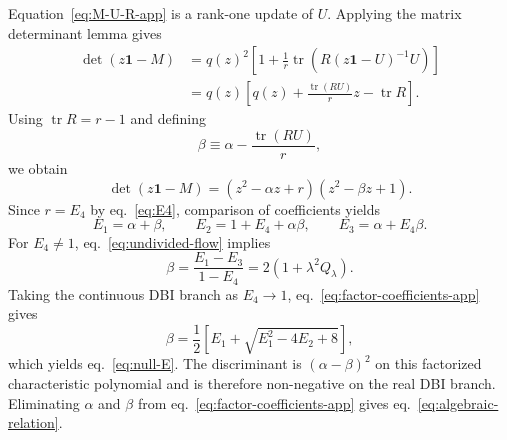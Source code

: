 \documentclass[a4paper,11pt]{article}
\numberwithin{equation}{section}
\newcommand{\tr}{\operatorname{tr}}
\newcommand{\Id}{\mathbf 1}
\begin{document}
Equation~\eqref{eq:M-U-R-app} is a rank-one update of $U$. Applying the matrix determinant lemma gives
\begin{align}
 \det(z\Id-M)
 &=q(z)^2\left[1+\frac1r\tr\!\left(R(z\Id-U)^{-1}U\right)\right]\nonumber\\
 &=q(z)\left[q(z)+\frac{\tr(RU)}{r}z-\tr R\right].
 \label{eq:char-factor-intermediate-app}
\end{align}
Using $\tr R=r-1$ and defining
\begin{equation}
 \beta\equiv\alpha-\frac{\tr(RU)}{r},
\end{equation}
we obtain
\begin{equation}
 \det(z\Id-M)
 =(z^2-\alpha z+r)(z^2-\beta z+1).
 \label{eq:char-factor-app}
\end{equation}
Since $r=E_4$ by eq.~\eqref{eq:E4}, comparison of coefficients yields
\begin{equation}
 E_1=\alpha+\beta,
 \qquad
 E_2=1+E_4+\alpha\beta,
 \qquad
 E_3=\alpha+E_4\beta.
 \label{eq:factor-coefficients-app}
\end{equation}
For $E_4\neq1$, eq.~\eqref{eq:undivided-flow} implies
\begin{equation}
 \beta=\frac{E_1-E_3}{1-E_4}=2(1+\lambda^2Q_\lambda).
 \label{eq:beta-app}
\end{equation}
Taking the continuous DBI branch as $E_4\to1$, eq.~\eqref{eq:factor-coefficients-app} gives
\begin{equation}
 \beta=\frac12\left[E_1+\sqrt{E_1^2-4E_2+8}\right],
\end{equation}
which yields eq.~\eqref{eq:null-E}. The discriminant is $(\alpha-\beta)^2$ on this factorized characteristic polynomial and is therefore non-negative on the real DBI branch. Eliminating $\alpha$ and $\beta$ from eq.~\eqref{eq:factor-coefficients-app} gives eq.~\eqref{eq:algebraic-relation}.
\end{document}
